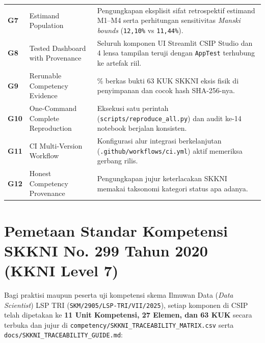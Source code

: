 \documentclass[11pt,a4paper,oneside]{book}
\newcommand{\code}[1]{{\small\nolinkurl{#1}}}
\begin{document}
\begin{longtable}{@{} p{1.0cm} >{\raggedright\arraybackslash}p{4.0cm} >{\raggedright\arraybackslash}p{9.8cm} @{}}
\textbf{G7} & Estimand Population & Pengungkapan eksplisit sifat retrospektif estimand M1--M4 serta perhitungan sensitivitas \emph{Manski bounds} (\texttt{12,10\%} vs \texttt{11,44\%}). \\
\textbf{G8} & Tested Dashboard with Provenance & Seluruh komponen UI Streamlit CSIP Studio dan 4 lensa tampilan teruji dengan \code{AppTest} terhubung ke artefak riil. \\
\textbf{G9} & Rerunable Competency Evidence & 100\% berkas bukti 63 KUK SKKNI eksis fisik di penyimpanan dan cocok hash SHA-256-nya. \\
\textbf{G10} & One-Command Complete Reproduction & Eksekusi satu perintah (\code{scripts/reproduce_all.py}) dan audit ke-14 notebook berjalan konsisten. \\
\textbf{G11} & CI Multi-Version Workflow & Konfigurasi alur integrasi berkelanjutan (\code{.github/workflows/ci.yml}) aktif memeriksa gerbang rilis. \\
\textbf{G12} & Honest Competency Provenance & Pengungkapan jujur keterlacakan SKKNI memakai taksonomi kategori status apa adanya. \\
\end{longtable}

\section{Pemetaan Standar Kompetensi SKKNI No. 299 Tahun 2020 (KKNI Level 7)}

Bagi praktisi maupun peserta uji kompetensi skema Ilmuwan Data (\emph{Data Scientist}) LSP TRI (\code{SKM/2905/LSP-TRI/VII/2025}), setiap komponen di CSIP telah dipetakan ke \textbf{11 Unit Kompetensi, 27 Elemen, dan 63 KUK} secara terbuka dan jujur di \code{competency/SKKNI_TRACEABILITY_MATRIX.csv} serta \code{docs/SKKNI_TRACEABILITY_GUIDE.md}:
\end{document}
